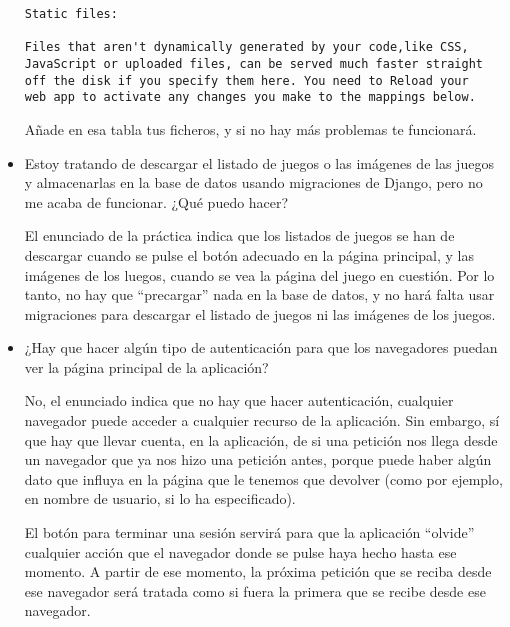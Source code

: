 \begin{itemize}
  \begin{verbatim}
Static files:

Files that aren't dynamically generated by your code,like CSS,
JavaScript or uploaded files, can be served much faster straight
off the disk if you specify them here. You need to Reload your
web app to activate any changes you make to the mappings below.
\end{verbatim}

  Añade en esa tabla tus ficheros, y si no hay más problemas te funcionará.

\item Estoy tratando de descargar el listado de juegos o las imágenes de las juegos y almacenarlas en la base de datos usando migraciones de Django, pero no me acaba de funcionar. ¿Qué puedo hacer?

  El enunciado de la práctica indica que los listados de juegos se han de descargar cuando se pulse el botón adecuado en la página principal, y las imágenes de los luegos, cuando se vea la página del juego en cuestión. Por lo tanto, no hay que ``precargar'' nada en la base de datos, y no hará falta usar migraciones para descargar el listado de juegos ni las imágenes de los juegos.

\item ¿Hay que hacer algún tipo de autenticación para que los navegadores puedan ver la página principal de la aplicación?

  No, el enunciado indica que no hay que hacer autenticación, cualquier navegador puede acceder a cualquier recurso de la aplicación. Sin embargo, sí que hay que llevar cuenta, en la aplicación, de si una petición nos llega desde un navegador que ya nos hizo una petición antes, porque puede haber algún dato que influya en la página que le tenemos que devolver (como por ejemplo, en nombre de usuario, si lo ha especificado).

  El botón para terminar una sesión servirá para que la aplicación ``olvide'' cualquier acción que el navegador donde se pulse haya hecho hasta ese momento. A partir de ese momento, la próxima petición que se reciba desde ese navegador será tratada como si fuera la primera que se recibe desde ese navegador.
\end{itemize}

